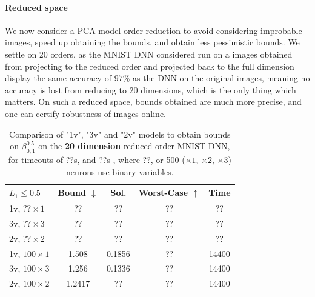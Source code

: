 \documentclass[letterpaper]{article} %
\begin{document}
\paragraph{Reduced space}

We now consider a PCA model order reduction to avoid considering improbable images, 
speed up obtaining the bounds, and obtain less pessimistic bounds.
We settle on 20 orders, as the MNIST DNN considered run on a images obtained from projecting to the reduced order and projected back to the full dimension 
display the same accuracy of $97$\% as the DNN on the original images, meaning no accuracy is lost from reducing to 20 dimensions, which is the only thing which matters. On such a reduced space, bounds obtained are much more precise, and one can certify robustness of images online.



	\begin{table}[h!]
	\begin{tabular}{|l|c|c|c|c|}\hline\hline
		$L_1\leq 0.5$ &        Bound $\downarrow$ &  Sol. &      Worst-Case $\uparrow$ &  Time \\\hline \hline
		
1v, $?? \times 1$ & ?? & ?? & ?? & ?? \\\hline 
		3v, $?? \times 3$ & ?? & ?? & ?? & ?? \\\hline 
	 2v, $?? \times 2$ & ?? & ?? & ?? & ?? \\\hline\hline
	 
		1v, $100 \times 1$ & 1.508 & 0.1856 & ?? & 14400 \\\hline 
		3v, $100 \times 3$ & 1.256 & 0.1336 & ?? & 14400 \\\hline 
	 2v, $100 \times 2$ & 1.2417 & ?? & ?? & 14400 \\\hline\hline
	 
	\end{tabular}
	\caption{Comparison of "1v", "3v" and "2v" models 
	to obtain bounds on $\beta^{0.5}_{0,1}$ on the {\bf 20 dimension}  reduced order MNIST DNN, for timeouts of ??s, and ??s , where ??,  or 500 ($\times 1$, $\times 2$, $\times 3$) neurons use binary variables.}
\end{table}
\end{document}

